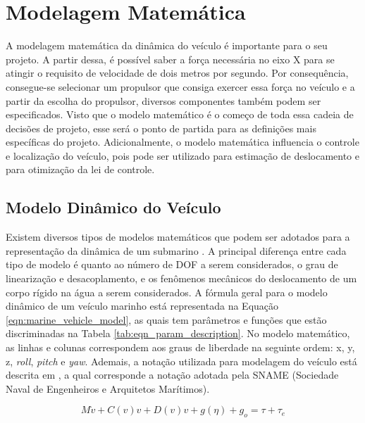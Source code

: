 \section{Modelagem Matemática}
\label{sec:modelagem-matematica}

A modelagem matemática da dinâmica do veículo é importante para o seu projeto. A partir dessa, é possível saber a força necessária no eixo X para se atingir o requisito de velocidade de dois metros por segundo. Por consequência, consegue-se selecionar um propulsor que consiga exercer essa força no veículo e a partir da escolha do propulsor, diversos componentes também podem ser especificados. Visto que o modelo matemático é o começo de toda essa cadeia de decisões de projeto, esse será o ponto de partida para as definições mais específicas do projeto. Adicionalmente, o modelo matemática influencia o controle e localização do veículo, pois pode ser utilizado para estimação de deslocamento e para otimização da lei de controle.

\subsection{Modelo Dinâmico do Veículo}

Existem diversos tipos de modelos matemáticos que podem ser adotados para a representação da dinâmica de um submarino \cite{Antonelli2018} \cite{fossen2011handbook}. A principal diferença entre cada tipo de modelo é quanto ao número de DOF a serem considerados, o grau de linearização e desacoplamento, e os fenômenos mecânicos do deslocamento de um corpo rígido na água a serem considerados. A fórmula geral para o modelo dinâmico de um veículo marinho \cite{fossen1994guidance} está representada na Equação \ref{eqn:marine_vehicle_model}, as quais tem parâmetros e funções que estão discriminadas na Tabela \ref{tab:eqn_param_description}. No modelo matemático, as linhas e colunas correspondem aos graus de liberdade na seguinte ordem: x, y, z, \textit{roll}, \textit{pitch} e \textit{yaw}. Ademais, a notação utilizada para modelagem do veículo está descrita em \cite{fossen2011handbook}, a qual corresponde a notação adotada pela SNAME (Sociedade Naval de Engenheiros e Arquitetos Marítimos).

\begin{equation}
	\label{eqn:marine_vehicle_model}
	M\dot{v} + C(v)v + D(v)v + g(\eta) + g_o = \tau + \tau_{e}
\end{equation}

